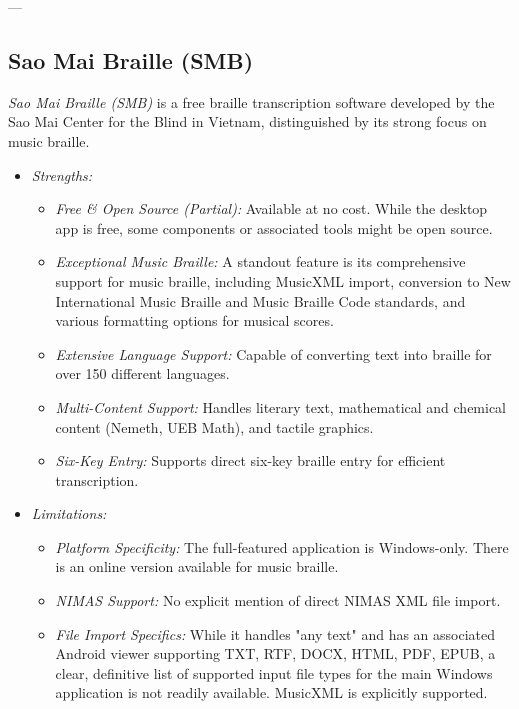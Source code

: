 ---

\subsection{Sao Mai Braille (SMB)}
\emph{Sao Mai Braille (SMB)} is a free braille transcription software developed by the Sao Mai Center for the Blind in Vietnam, distinguished by its strong focus on music braille.

\begin{itemize}
    \item \emph{Strengths:}
    \begin{itemize}
        \item \emph{Free \& Open Source (Partial):} Available at no cost. While the desktop app is free, some components or associated tools might be open source.
        \item \emph{Exceptional Music Braille:} A standout feature is its comprehensive support for music braille, including MusicXML import, conversion to New International Music Braille and Music Braille Code standards, and various formatting options for musical scores\footnotemark{}.
        \item \emph{Extensive Language Support:} Capable of converting text into braille for over 150 different languages.
        \item \emph{Multi-Content Support:} Handles literary text, mathematical and chemical content (Nemeth, UEB Math), and tactile graphics.
        \item \emph{Six-Key Entry:} Supports direct six-key braille entry for efficient transcription.
    \end{itemize}
    \item \emph{Limitations:}
    \begin{itemize}
        \item \emph{Platform Specificity:} The full-featured application is Windows-only. There is an online version available for music braille.
        \item \emph{NIMAS Support:} No explicit mention of direct NIMAS XML file import.
        \item \emph{File Import Specifics:} While it handles "any text" and has an associated Android viewer supporting TXT, RTF, DOCX, HTML, PDF, EPUB, a clear, definitive list of supported input file types for the main Windows application is not readily available. MusicXML is explicitly supported.
    \end{itemize}

\end{itemize}
